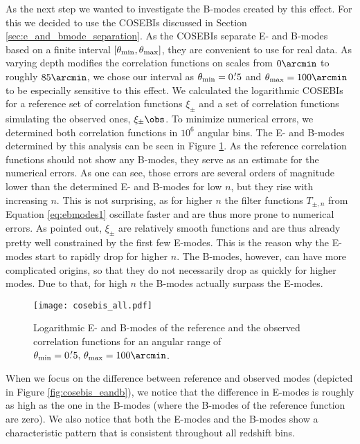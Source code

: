 As the next step we wanted to investigate the B-modes created by this effect. For this we decided to use the COSEBIs discussed in Section \ref{sec:e_and_bmode_separation}. As the COSEBIs separate E- and B-modes based on a finite interval $[\theta_{\rm{min}},\theta_{\rm{max}}]$, they are convenient to use for real data. As varying depth modifies the correlation functions on scales from $0\arcmin$ to roughly $85\arcmin$, we chose our interval as $\theta_{\rm{min}}=0.\!^\prime 5$ and $\theta_{\rm{max}}=100\arcmin$ to be especially sensitive to this effect. We calculated the logarithmic COSEBIs \citep[compare][]{2010A&A...520A.116S} for a reference set of correlation functions $\xi_\pm$ and a set of correlation functions simulating the observed ones, $\xi_\pm\obs$. To minimize numerical errors, we determined both correlation functions in $10^6$ angular bins. The E- and B-modes determined by this analysis can be seen in Figure \ref{fig:cosebis_all}. As the reference correlation functions should not show any B-modes, they serve as an estimate for the numerical errors. As one can see, those errors are several orders of magnitude lower than the determined E- and B-modes for low $n$, but they rise with increasing $n$. This is not surprising, as for higher $n$ the filter functions $T_{\pm,n}$ from Equation \eqref{eq:ebmodes1} oscillate faster and are thus more prone to numerical errors. As \citet{2018arXiv181002353A} pointed out, $\xi_\pm$ are relatively smooth functions and are thus already pretty well constrained by the first few E-modes. This is the reason why the E-modes start to rapidly drop for higher $n$. The B-modes, however, can have more complicated origins, so that they do not necessarily drop as quickly for higher modes. Due to that, for high $n$ the B-modes actually surpass the E-modes.
\begin{figure}
\centering
\texttt{[image: cosebis\_all.pdf]}
\caption[E- and B-modes of the reference and the observed correlation functions]{Logarithmic E- and B-modes of the reference and the observed correlation functions for an angular range of $\theta_{\rm{min}}=0.\!^\prime 5,\,\theta_{\rm{max}}=100\arcmin$.}
\label{fig:cosebis_all}
\end{figure}

When we focus on the difference between reference and observed modes (depicted in Figure \ref{fig:cosebis_eandb}), we notice that the difference in E-modes is roughly as high as the one in the B-modes (where the B-modes of the reference function are zero). We also notice that both the E-modes and the B-modes show a characteristic pattern that is consistent throughout all redshift bins.

